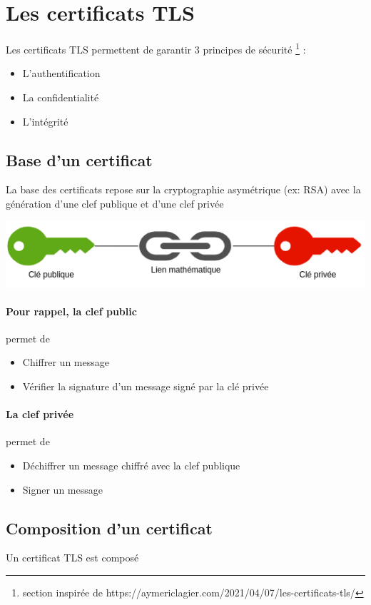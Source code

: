 \documentclass[french, 12pt]{article}%
\newcommand{\itemE}{\item[$\bullet$]}
\begin{document}
\section{Les certificats TLS}
Les certificats TLS permettent de garantir 3 principes de sécurité \footnote{section inspirée de https://aymericlagier.com/2021/04/07/les-certificats-tls/} : 
\begin{itemize}
\itemE L'authentification
\itemE La confidentialité
\itemE L'intégrité
\end{itemize}

\subsection{Base d'un certificat}

La base des certificats repose sur la cryptographie asymétrique (ex: RSA) avec la génération d'une clef publique et d'une clef privée

\begin{center}
\includegraphics[scale=0.5]{./ressource/clefPubliquePrive}
\end{center}

 
\paragraph{Pour rappel, la clef public} permet de 
\begin{itemize}
\itemE Chiffrer un message
\itemE Vérifier la signature d’un message signé par la clé privée
\end{itemize}

\paragraph{La clef privée} permet de 
\begin{itemize}
\itemE Déchiffrer un message chiffré avec la clef publique
\itemE Signer un message
\end{itemize}

\subsection{Composition d'un certificat}
Un certificat TLS est composé 
\end{document}
